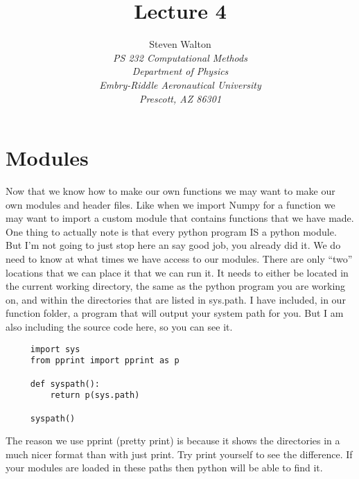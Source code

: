 \documentclass[11pt]{article}   %
\title{Lecture 4}
\author{Steven Walton\\     %
\textit{PS 232 Computational Methods}\\
\textit{Department of Physics}\\
\textit{Embry-Riddle Aeronautical University}\\
\textit{Prescott, AZ   86301}}
\begin{document}
\maketitle

\section*{Modules}
Now that we know how to make our own functions we may want to make our own modules and header files.  Like when we import Numpy for a function we may want to import a custom module that contains functions that we have made.
One thing to actually note is that every python program IS a python module.  But I'm not going to just stop here an say good job, you already did it. We do need to know at what times we have access to our modules.  There are
only ``two'' locations that we can place it that we can run it.  It needs to either be located in the current working directory, the same as the python program you are working on, and within the directories that are listed in sys.path.
I have included, in our function folder, a program that will output your system path for you.  But I am also including the source code here, so you can see it.

\begin{tcolorbox}
   \begin{lstlisting}
     import sys
     from pprint import pprint as p
     
     def syspath():
         return p(sys.path)

     syspath()       
   \end{lstlisting}
\end{tcolorbox}

The reason we use pprint (pretty print) is because it shows the directories in a much nicer format than with just print.  Try print yourself to see the difference. If your modules are loaded in these paths then python will be able to
find it.  
\end{document}
